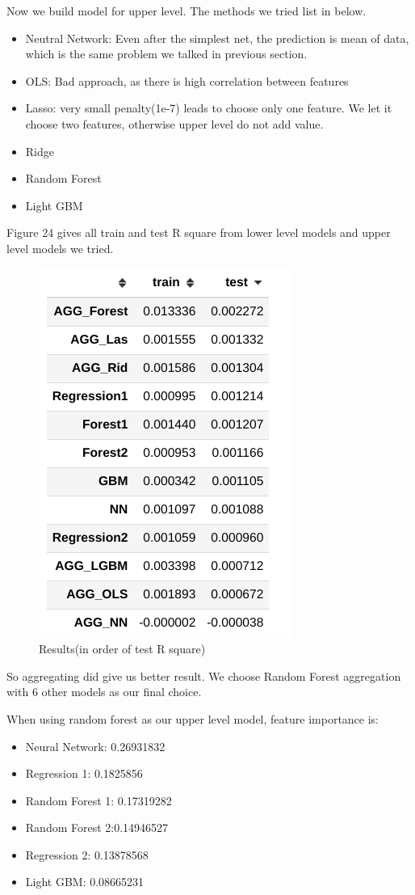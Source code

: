 \documentclass[onecolumn]{article}
\begin{document}
Now we build model for upper level. The methods we tried list in below.
\begin{itemize}
    \item Neutral Network: Even after the simplest net, the prediction is mean of data, which is the same problem we talked in previous section.
    \item OLS: Bad approach, as there is high correlation between features
    \item Lasso: very small penalty(1e-7) leads to choose only one feature. We let it choose two features, otherwise upper level do not add value.
    \item Ridge
    \item Random Forest
    \item Light GBM
\end{itemize}
Figure 24 gives all train and test R square from lower level models and upper level models we tried. \pagebreak

\begin{figure}[ht]
    \centering
    \includegraphics[scale=0.5]{agg_2.png}
    \caption{Results(in order of test R square)}
    \label{fig:label}
\end{figure}

So aggregating did give us better result. We choose Random Forest aggregation with 6 other models as our final choice.

When using random forest as our upper level model, feature importance is:
    \begin{itemize}
        \item Neural Network: 0.26931832
        \item Regression 1: 0.1825856
        \item Random Forest 1: 0.17319282
        \item Random Forest 2:0.14946527
        \item Regression 2: 0.13878568
        \item Light GBM: 0.08665231
    \end{itemize}
\end{document}
